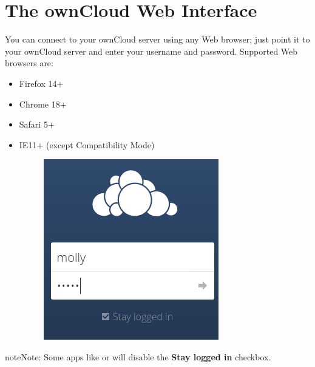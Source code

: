 \documentclass[letterpaper,10pt,english]{sphinxmanual}
\begin{document}
\chapter{The ownCloud Web Interface}
\label{webinterface:the-owncloud-web-interface}\label{webinterface::doc}
You can connect to your ownCloud server using any Web browser; just point it to
your ownCloud server and enter your username and password. Supported Web
browsers are:
\begin{itemize}
\item {} 
Firefox 14+

\item {} 
Chrome 18+

\item {} 
Safari 5+

\item {} 
IE11+ (except Compatibility Mode)
\begin{figure}[htbp]
\centering

\includegraphics{oc_connect.png}
\end{figure}

\end{itemize}

\begin{notice}{note}{Note:}
Some apps like  or  will disable
the \textbf{Stay logged in} checkbox.
\end{notice}
\end{document}
